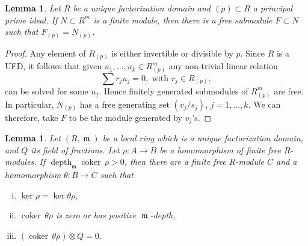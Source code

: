 \documentclass{amsart}
\numberwithin{equation}{section}
\theoremstyle{definition}
\theoremstyle{plain}
\newtheorem{lemma}[definition]{Lemma}
\theoremstyle{remark}
\begin{document}
\begin{lemma}\label{lemma_depth_lemmas_free_loc}
Let $R$ be a unique factorization domain and 
$(p)\subset R$  a principal prime ideal.
If $N\subset R^m$ is a finite module,
then there is a free submodule $F\subset N$ such that $F_{(p)}=N_{(p)}$.
\end{lemma}
\begin{proof}
Any element of $R_{(p)}$ is either invertible or divisible by $p$. 
Since $R$ is a UFD, it follows that
given $u_1,\ldots,u_k\in R_{(p)}^m$
any non-trivial linear relation 
\[
	\sum r_ju_j=0,\text{ with }r_j\in R_{(p)},
\]
can be solved for some $u_j$. 
Hence finitely generated submodules of $R_{(p)}^m$ are free. In particular,
$N_{(p)}$ has a free generating set $(v_j/s_j)$, $j=1,\ldots,k$. We can therefore,
take $F$ to be the module generated by $v_j$'s.
\end{proof}
\begin{lemma}\label{lemma_depth_lemmas_reduce_to_torsion}
Let $(R,{{\mathop{\mathfrak{m}}}})$ be a local ring which is a unique factorization domain, and
$Q$ its field of fractions. Let $\rho:A\rightarrow B$ be a homomorphism of
finite free $R$-modules. If ${\mathop{\mathrm{depth}}\nolimits _{{\mathop{\mathfrak{m}}}}} {{\mathop{\mathrm{coker\,}}}} \rho>0$, then there are a finite free $R$-module $C$ and a homomorphism $\theta:B\rightarrow C$ such that
\begin{enumerate}[(i)]
\item $\ker \rho=\ker\theta\rho$, 
\item ${{\mathop{\mathrm{coker\,}}}} \theta\rho$ is zero or has positive ${{\mathop{\mathfrak{m}}}}$-depth,
\item $({{\mathop{\mathrm{coker\,}}}}\theta\rho)\otimes Q=0$.
\end{enumerate}
\end{lemma}
\end{document}
